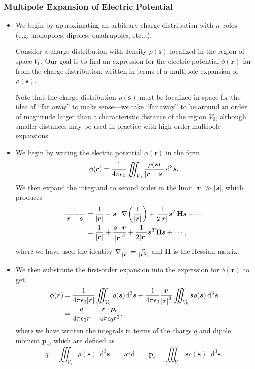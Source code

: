 \documentclass[11pt, a4paper]{article}
\newcommand{\diff}{\mathop{}\!\mathrm{d}} %
\newcommand{\eqtext}[1]{\qquad \text{#1} \qquad}
\renewcommand{\vec}[1]{\bm{#1}} %
\newcommand{\mat}[1]{\mathbf{#1}} %
\renewcommand{\r}{\vec{r}}
\newcommand{\ee}{\epsilon_{0}}  %
\newcommand{\pe}{\vec{p}_{e}}  %
\newcommand{\s}{\vec{s}}  %
\newcommand{\ds}{\diff^{3} \s}  %
\renewcommand{\grad}{\nabla}
\begin{document}
\subsubsection{Multipole Expansion of Electric Potential}
\begin{itemize}
	\item We begin by approximating an arbitrary charge distribution with $ n $-poles (e.g. monopoles, dipoles, quadrupoles, etc...).
	
    Consider a charge distribution with density $ \rho(\s) $ localized in the region of space $ V_{0} $. Our goal is to find an expression for the electric potential $ \phi(\r) $ far from the charge distribution, written in terms of a multipole expansion of $ \rho(\s) $.
	
    Note that the charge distribution $ \rho(\s) $ must be localized in space for the idea of ``far away'' to make sense---we take ``far away'' to be around an order of magnitude larger than a characteristic distance of the region $ V_{0} $, although smaller distances may be used in practice with high-order multipole expansions.

    \item We begin by writing the electric potential $ \phi(\r) $ in the form
	\begin{equation*}
		\phi(\r) = \frac{1}{4\pi \ee}\iiint_{V_{0}}\frac{\rho(\s)}{\abs{\r - \s}} \ds.
	\end{equation*}
    We then expand the integrand to second order in the limit $ \abs{\r} \gg \abs{\s}  $, which produces
	\begin{align*}
        \frac{1}{\abs{\r - \s}} &= \frac{1}{\abs{\r}} - \s \cdot \grad\left(\frac{1}{\abs{\r}}\right) + \frac{1}{2\abs{\r}} \s^{T}\mat{H}\s + \cdots\\
        &= \frac{1}{\abs{\r}} + \frac{\s \cdot \r}{\abs{\r}^{3}} + \frac{1}{2\abs{\r}} \s^{T}\mat{H}\s + \cdots,
	\end{align*}
    where we have used the identity $ \grad \frac{1}{\abs{\r}} = \frac{\r}{\abs{\r^{3}}} $ and $ \mat{H} $ is the Hessian matrix.

    \item We then substitute the first-order expansion into the expression for $ \phi(\r) $ to get
	\begin{align*}
		\phi(\r) &= \frac{1}{4\pi \ee \abs{\r}}\iiint_{V_{0}} \rho(\s) \ds + \frac{1}{4\pi \ee}\frac{\r}{\abs{\r}^{3}}\iiint_{V_{0}} \s \rho(\s)\ds\\
		& = \frac{q}{4\pi \ee r} + \frac{\r \cdot \pe}{4\pi \ee r^{3}},
	\end{align*}
    where we have written the integrals in terms of the charge $ q $ and dipole moment $ \pe $, which are defined as
	\begin{equation*}
		q = \iiint_{V_{0}} \rho(\s) \ds \eqtext{and} \pe = \iiint_{V_{0}} \s \rho(\s) \ds.
	\end{equation*}
	

\end{itemize}
\end{document}
